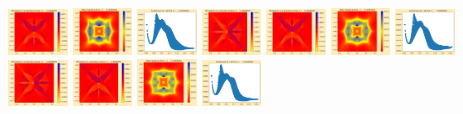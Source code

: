 \documentclass[11pt]{article}
\begin{document}
\includegraphics[width=0.11875\textwidth]{frame0051fig3.png}
\vskip 10pt 
\includegraphics[width=0.11875\textwidth]{frame0052fig0.png}
\includegraphics[width=0.11875\textwidth]{frame0052fig1.png}
\includegraphics[width=0.11875\textwidth]{frame0052fig2.png}
\includegraphics[width=0.11875\textwidth]{frame0052fig3.png}
\includegraphics[width=0.11875\textwidth]{frame0053fig0.png}
\includegraphics[width=0.11875\textwidth]{frame0053fig1.png}
\includegraphics[width=0.11875\textwidth]{frame0053fig2.png}
\includegraphics[width=0.11875\textwidth]{frame0053fig3.png}
\vskip 10pt 
\includegraphics[width=0.11875\textwidth]{frame0054fig0.png}
\includegraphics[width=0.11875\textwidth]{frame0054fig1.png}
\end{document}

